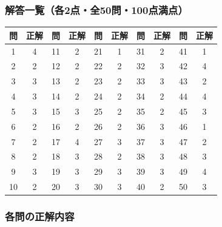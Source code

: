 \documentclass[b4paper,7pt,twocolumn,landscape]{jsarticle}
\begin{document}

\subsubsection*{解答一覧（各2点・全50問・100点満点）}

\vspace{2mm}

\begin{center}
\renewcommand{\arraystretch}{1.6}
\begin{tabular}{|c|c||c|c||c|c||c|c||c|c|}
\hline
\textbf{問} & \textbf{正解} & \textbf{問} & \textbf{正解} & \textbf{問} & \textbf{正解} & \textbf{問} & \textbf{正解} & \textbf{問} & \textbf{正解} \\
\hline
1  & 4 & 11 & 2 & 21 & 1 & 31 & 2 & 41 & 1 \\
\hline
2  & 2 & 12 & 2 & 22 & 2 & 32 & 3 & 42 & 4 \\
\hline
3  & 3 & 13 & 2 & 23 & 2 & 33 & 3 & 43 & 2 \\
\hline
4  & 3 & 14 & 2 & 24 & 2 & 34 & 2 & 44 & 4 \\
\hline
5  & 3 & 15 & 3 & 25 & 2 & 35 & 2 & 45 & 3 \\
\hline
6  & 2 & 16 & 2 & 26 & 2 & 36 & 3 & 46 & 1 \\
\hline
7  & 2 & 17 & 4 & 27 & 3 & 37 & 3 & 47 & 2 \\
\hline
8  & 2 & 18 & 3 & 28 & 2 & 38 & 3 & 48 & 3 \\
\hline
9  & 3 & 19 & 3 & 29 & 3 & 39 & 3 & 49 & 4 \\
\hline
10 & 2 & 20 & 3 & 30 & 3 & 40 & 2 & 50 & 3 \\
\hline
\end{tabular}
\end{center}

\vspace{4mm}

\subsubsection*{各問の正解内容}
\end{document}
